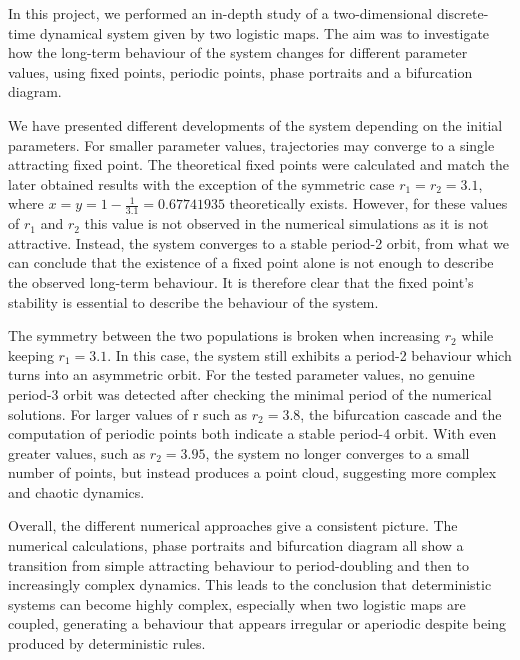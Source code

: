
In this project, we performed an in-depth study of a two-dimensional discrete-time dynamical system given by two logistic maps. The aim was to investigate how the long-term behaviour of the system changes for different parameter values, using fixed points, periodic points, phase portraits and a bifurcation diagram. 

We have presented different developments of the system depending on the initial parameters. For smaller parameter values, trajectories may converge to a single attracting fixed point.
The theoretical fixed points were calculated and match the later obtained results with the exception of the symmetric case $r_1=r_2=3.1$, where $x=y=1-\frac{1}{3.1}=0.67741935$ theoretically exists. However, for these values of $r_1$ and $r_2$ this value is not observed in the numerical simulations as it is not attractive.
Instead, the system converges to a stable period-2 orbit, from what we can conclude that the existence of a fixed point alone is not enough to describe the 
observed long-term behaviour. It is therefore clear that the fixed point's stability is essential to describe the behaviour of the system. 

The symmetry between the two populations is broken when increasing $r_2$ while keeping $r_1=3.1$. In this case, the system still 
exhibits a period-2 behaviour which turns into an asymmetric orbit. For the tested parameter values, no genuine period-3 orbit was detected after checking the minimal period of the numerical solutions. For larger values of r such as $r_2=3.8$, the bifurcation cascade and 
the computation of periodic points both indicate a stable period-4 orbit.
With even greater values, such as $r_2=3.95$, the system no longer converges to a small number of points, but instead produces a point cloud, suggesting more complex and chaotic dynamics.

Overall, the different numerical approaches give a consistent picture.
The numerical calculations, phase portraits and bifurcation diagram all show a transition from simple attracting behaviour to period-doubling and then to increasingly complex dynamics.
This leads to the conclusion that deterministic systems can become highly complex, especially when two logistic maps are coupled, generating a behaviour that appears irregular or aperiodic despite being produced by deterministic rules.


